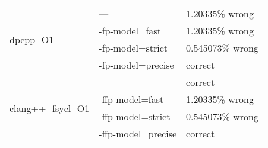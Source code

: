 \begin{center}
	\begin{table}
		\centering
		\begin{tabular}{||ll|l||}
			\hline
			\multirow{4}{*}{dpcpp -O1}          & ---                & 1.20335\% wrong  \\
			                                    & -fp-model=fast     & 1.20335\% wrong  \\
			                                    & -fp-model=strict   & 0.545073\% wrong \\
			                                    & -fp-model=precise  & correct          \\ \hline \hline
			\multirow{4}{*}{clang++ -fsycl -O1} & ---                & correct          \\
			                                    & -ffp-model=fast    & 1.20335\% wrong  \\
			                                    & -ffp-model=strict  & 0.545073\% wrong \\
			                                    & -ffp-model=precise & correct          \\ \hline
		\end{tabular}
		\caption{\label{tab:semantics}}
	\end{table}
\end{center}
